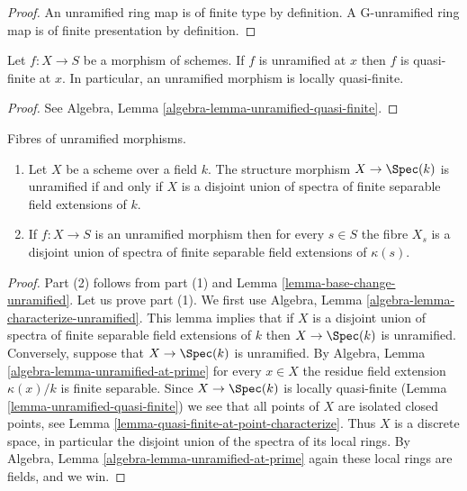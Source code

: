 \begin{proof}
An unramified ring map is of finite type by definition.
A G-unramified ring map is of finite presentation by definition.
\end{proof}

\begin{lemma}
\label{lemma-unramified-quasi-finite}
Let $f : X \to S$ be a morphism of schemes.
If $f$ is unramified at $x$ then $f$ is quasi-finite at $x$.
In particular, an unramified morphism is locally quasi-finite.
\end{lemma}

\begin{proof}
See Algebra, Lemma \ref{algebra-lemma-unramified-quasi-finite}.
\end{proof}

\begin{lemma}
\label{lemma-unramified-over-field}
Fibres of unramified morphisms.
\begin{enumerate}
\item Let $X$ be a scheme over a field $k$.
The structure morphism $X \to \Spec(k)$ is unramified if
and only if $X$ is a disjoint union of spectra of finite separable
field extensions of $k$.
\item If $f : X \to S$ is an unramified morphism then for every $s \in S$
the fibre $X_s$ is a disjoint union of spectra of finite separable field
extensions of $\kappa(s)$.
\end{enumerate}
\end{lemma}

\begin{proof}
Part (2) follows from part (1) and
Lemma \ref{lemma-base-change-unramified}.
Let us prove part (1).
We first use Algebra, Lemma \ref{algebra-lemma-characterize-unramified}.
This lemma implies that if $X$ is a disjoint union of spectra of finite
separable field extensions of $k$ then $X \to \Spec(k)$ is unramified.
Conversely, suppose that $X \to \Spec(k)$ is unramified.
By Algebra, Lemma \ref{algebra-lemma-unramified-at-prime} for every $x \in X$
the residue field extension $\kappa(x)/k$ is
finite separable. Since $X \to \Spec(k)$ is locally
quasi-finite (Lemma \ref{lemma-unramified-quasi-finite})
we see that all points of $X$ are isolated closed points, see
Lemma \ref{lemma-quasi-finite-at-point-characterize}.
Thus $X$ is a discrete space, in particular the disjoint union
of the spectra of its local rings. By
Algebra, Lemma \ref{algebra-lemma-unramified-at-prime} again these
local rings are fields, and we win.
\end{proof}

